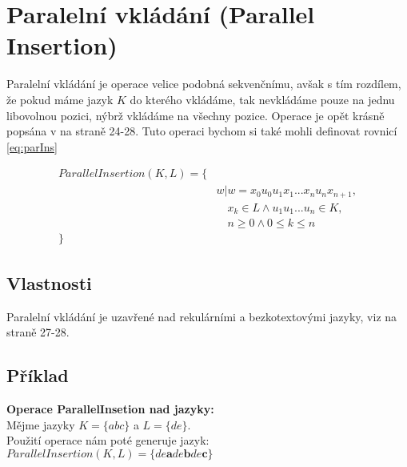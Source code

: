 \section{Paralelní vkládání (Parallel Insertion)}\label{sec:parIns}
Paralelní vkládání je operace velice podobná sekvenčnímu, avšak s tím rozdílem, že pokud máme jazyk $K$ do kterého vkládáme, tak nevkládáme pouze na jednu libovolnou pozici, nýbrž vkládáme na všechny pozice. Operace je opět krásně popsána v \cite{lilaKari} na straně 24-28. Tuto operaci bychom si také mohli definovat rovnicí \ref{eq:parIns}

\begin{equation}\label{eq:parIns}
	\begin{split}
	ParallelInsertion(K,L) =\{& \\
	&w|w=x_{0}u_{0}u_{1}x_{1}...x_{n}u_{n}x_{n+1},\\
	&\quad x_{k} \in L \land u_{1}u_{1}...u_{n} \in K,\\
	&\quad n \geq 0	\land 0\leq k \leq n\\	
	\}&
	\end{split}
\end{equation}

\subsection{Vlastnosti}
Paralelní vkládání je uzavřené nad rekulárními a bezkotextovými jazyky, viz \cite{lilaKari} na straně 27-28.

\subsection{Příklad}
\textbf{Operace ParallelInsetion nad jazyky:}\\
Mějme jazyky $K=\{abc\}$ a $L=\{de\}$.\\
Použití operace nám poté generuje jazyk: $ParallelInsertion(K,L) = \{de\textbf{a}de\textbf{b}de\textbf{c}\}$